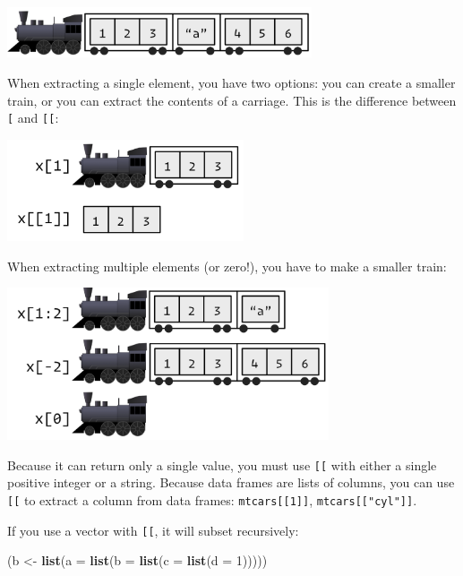 \documentclass[]{book}
\newenvironment{Shaded}{\begin{snugshade}}{\end{snugshade}}
\newcommand{\KeywordTok}[1]{\textcolor[rgb]{0.13,0.29,0.53}{\textbf{#1}}}
\newcommand{\DataTypeTok}[1]{\textcolor[rgb]{0.13,0.29,0.53}{#1}}
\newcommand{\DecValTok}[1]{\textcolor[rgb]{0.00,0.00,0.81}{#1}}
\newcommand{\StringTok}[1]{\textcolor[rgb]{0.31,0.60,0.02}{#1}}
\newcommand{\NormalTok}[1]{#1}
\theoremstyle{definition}
\theoremstyle{definition}
\theoremstyle{definition}
\theoremstyle{remark}
\begin{document}
\begin{center}\includegraphics[width=3.54in]{images/subsetting/train} \end{center}

When extracting a single element, you have two options: you can create a
smaller train, or you can extract the contents of a carriage. This is
the difference between \texttt{{[}} and \texttt{{[}{[}}:

\begin{center}\includegraphics[width=2.75in]{images/subsetting/train-single} \end{center}

When extracting multiple elements (or zero!), you have to make a smaller
train:

\begin{center}\includegraphics[width=3.74in]{images/subsetting/train-multiple} \end{center}

Because it can return only a single value, you must use \texttt{{[}{[}}
with either a single positive integer or a string. Because data frames
are lists of columns, you can use \texttt{{[}{[}} to extract a column
from data frames: \texttt{mtcars{[}{[}1{]}{]}},
\texttt{mtcars{[}{[}"cyl"{]}{]}}.

If you use a vector with \texttt{{[}{[}}, it will subset recursively:

\begin{Shaded}
\begin{Highlighting}[]
\NormalTok{(b <-}\StringTok{ }\KeywordTok{list}\NormalTok{(}\DataTypeTok{a =} \KeywordTok{list}\NormalTok{(}\DataTypeTok{b =} \KeywordTok{list}\NormalTok{(}\DataTypeTok{c =} \KeywordTok{list}\NormalTok{(}\DataTypeTok{d =} \DecValTok{1}\NormalTok{)))))}
\end{Highlighting}
\end{Shaded}
\end{document}
